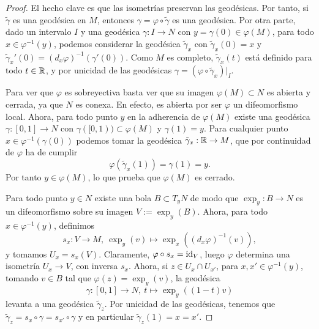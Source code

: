 \documentclass[11pt,a4paper]{amsbook}
\theoremstyle{remark} \newtheorem{rmk}[subsection]{Observación}
\theoremstyle{definition} \newtheorem{defn}[subsection]{Definición}
\theoremstyle{definition} \newtheorem{ex}[subsection]{Ejemplo}
\theoremstyle{definition} \newtheorem{ej}[subsection]{Ejercicio}
\begin{document}
\begin{proof}
  El hecho clave es que las isometrías preservan las geodésicas. Por tanto, si $\tilde{\gamma}$ es una geodésica en $M$, entonces $\gamma=\varphi \circ \tilde{\gamma}$ es una geodésica. Por otra parte, dado un intervalo $I$ y una geodésica $\gamma:I\rightarrow N$ con $y=\gamma(0) \in \varphi(M)$, para todo $x\in \varphi^{-1}(y)$, podemos considerar la geodésica $\tilde{\gamma}_x$ con $\tilde{\gamma}_x(0)=x$ y $\tilde{\gamma}_x'(0)=(d_x\varphi)^{-1}(\gamma'(0))$. Como $M$ es completo, $\tilde{\gamma}_x(t)$ está definido para todo $t\in\mathbb R$, y por unicidad de las geodésicas $\gamma = (\varphi \circ \tilde{\gamma}_x)|_{I}$.

  Para ver que $\varphi$ es sobreyectiva basta ver que su imagen $\varphi(M)\subset N$ es abierta y cerrada, ya que $N$ es conexa. En efecto, es abierta por ser $\varphi$ un difeomorfismo local. Ahora, para todo punto $y$ en la adherencia de $\varphi(M)$ existe una geodésica $\gamma:[0,1]\rightarrow N$ con $\gamma([0,1))\subset \varphi(M)$ y $\gamma(1)=y$. Para cualquier punto $x\in \varphi^{-1}(\gamma(0))$ podemos tomar la geodésica $\tilde{\gamma}_x:\mathbb R \rightarrow M$, que por continuidad de $\varphi$ ha de cumplir
  \begin{equation*}
\varphi(\tilde{\gamma}_x(1)) = \gamma(1)=y.
  \end{equation*}
  Por tanto $y\in \varphi(M)$, lo que prueba que $\varphi(M)$ es cerrado.

  Para todo punto $y\in N$ existe una bola $B\subset T_y N$ de modo que $\exp_y:B\rightarrow N$ es un difeomorfismo sobre su imagen $V:=\exp_y(B)$. Ahora, para todo $x\in \varphi^{-1}(y)$, definimos
  \begin{equation*}
s_x: V \rightarrow M, \ \exp_y(v) \mapsto \exp_x((d_x\varphi)^{-1}(v)),
  \end{equation*}
  y tomamos $U_x=s_x(V)$. Claramente, $\varphi\circ s_x = \mathrm{id}_V$, luego $\varphi$ determina una isometría $U_x\rightarrow V$, con inversa $s_x$. Ahora, si $z \in U_x \cap U_{x'}$, para $x,x' \in \varphi^{-1}(y)$, tomando $v\in B$ tal que $\varphi(z)=\exp_y(v)$, la geodésica
  \begin{equation*}
\gamma:[0,1]\rightarrow N, \ t \mapsto \exp_y((1-t) v)
  \end{equation*}
  levanta a una geodésica $\tilde{\gamma}_z$. Por unicidad de las geodésicas, tenemos que $\tilde{\gamma}_z = s_x\circ \gamma = s_{x'}\circ \gamma$ y en particular $\tilde{\gamma}_z(1)=x=x'$.
\end{proof}
\end{document}

